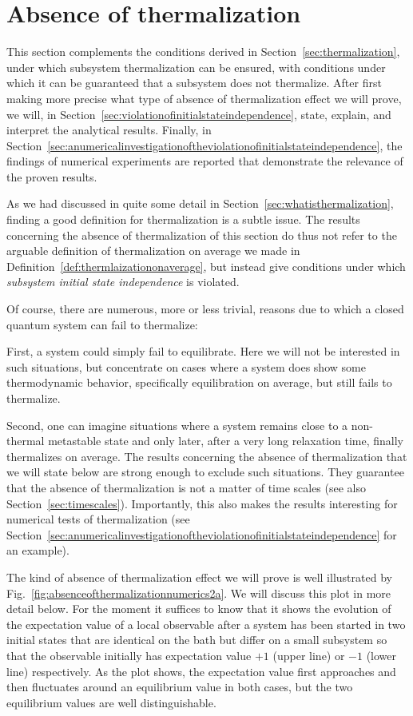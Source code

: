 \documentclass[a4paper,12pt,listof=totoc,index=totoc,bibliography=totoc,headsepline=false,headings=normal,BCOR16.153846mm,DIV12,headinclude,twoside,cleardoublepage=empty,numbers=noenddot,final]{scrreprt}
\theoremstyle{mystyle}
\numberwithin{equation}{section}
\numberwithin{figure}{section}
\numberwithin{lemma}{section}
\numberwithin{theorem}{section}
\numberwithin{corollary}{section}
\numberwithin{definition}{section}
\numberwithin{conjecture}{section}
\numberwithin{observation}{section}
\newcommand{\+}{\mkern2mu}
\DeclareMathOperator{\1}{\mathds{1}}
\begin{document}
\section{Absence of thermalization}
\label{sec:absenceofthermalization}
%
This section complements the conditions derived in Section~\ref{sec:thermalization}, under which subsystem thermalization can be ensured, with conditions under which it can be guaranteed that a subsystem does not thermalize.
After first making more precise what type of absence of thermalization effect we will prove, we will, in Section~\ref{sec:violationofinitialstateindependence}, state, explain, and interpret the analytical results.
Finally, in Section~\ref{sec:anumericalinvestigationoftheviolationofinitialstateindependence}, the findings of numerical experiments are reported that demonstrate the relevance of the proven results.

As we had discussed in quite some detail in Section~\ref{sec:whatisthermalization}, finding a good definition for thermalization is a subtle issue.
The results concerning the absence of thermalization of this section do thus not refer to the arguable definition of thermalization on average we made in Definition~\ref{def:thermlaizationonaverage}, but instead give conditions under which \emph{subsystem initial state independence} is violated.

Of course, there are numerous, more or less trivial, reasons due to which a closed quantum system can fail to thermalize:

First, a system could simply fail to equilibrate.
Here we will not be interested in such situations, but concentrate on cases where a system does show some thermodynamic behavior, specifically equilibration on average, but still fails to thermalize.

Second, one can imagine situations where a system remains close to a non-thermal metastable state and only later, after a very long relaxation time, finally thermalizes on average.
The results concerning the absence of thermalization that we will state below are strong enough to exclude such situations.
They guarantee that the absence of thermalization is not a matter of time scales (see also Section~\ref{sec:timescales}).
Importantly, this also makes the results interesting for numerical tests of thermalization (see Section~\ref{sec:anumericalinvestigationoftheviolationofinitialstateindependence} for an example).

The kind of absence of thermalization effect we will prove is well illustrated by Fig.~\ref{fig:absenceofthermalizationnumerics2a}.
We will discuss this plot in more detail below. 
For the moment it suffices to know that it shows the evolution of the expectation value of a local observable after a system has been started in two initial states that are identical on the bath but differ on a small subsystem so that the observable initially has expectation value $+1$ (upper line) or $-1$ (lower line) respectively.
As the plot shows, the expectation value first approaches and then fluctuates around an equilibrium value in both cases, but the two equilibrium values are well distinguishable.
\end{document}
